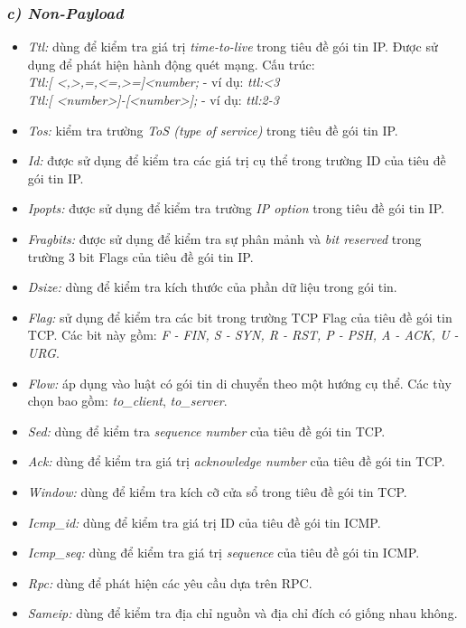 \subsubsection*{\textit{c) Non-Payload}}

\begin{itemize}
\item \emph{Ttl:} dùng để kiểm tra giá trị \emph{time-to-live} trong tiêu đề gói tin IP. Được sử dụng để phát hiện hành động quét mạng. Cấu trúc:
\\ \tab \emph{Ttl:[ <,>,=,<=,>=]<number;} - ví dụ: \emph{ttl:<3}
\\ \tab \emph{Ttl:[ <number>]-[<number>];} - ví dụ: \emph{ttl:2-3}
\item \emph{Tos:} kiểm tra trường \emph{ToS (type of service)} trong tiêu đề gói tin IP.
\item \emph{Id:} được sử dụng để kiểm tra các giá trị cụ thể trong trường ID của tiêu đề gói tin IP.
\item \emph{Ipopts:} được sử dụng để kiểm tra trường \emph{IP option} trong tiêu đề gói tin IP.
\item \emph{Fragbits:} được sử dụng để kiểm tra sự phân mảnh và \emph{bit reserved} trong trường 3 bit Flags của tiêu đề gói tin IP.
\item \emph{Dsize:} dùng để kiểm tra kích thước của phần dữ liệu trong gói tin.
\item \emph{Flag:} sử dụng để kiểm tra các bit trong trường TCP Flag của tiêu đề gói tin TCP. Các bit này gồm: \emph{F - FIN, S - SYN, R - RST, P - PSH, A - ACK, U - URG}.
\item \emph{Flow:} áp dụng vào luật có gói tin di chuyển theo một hướng cụ thể. Các tùy chọn bao gồm: \emph{to\_client}, \emph{to\_server}.
\item \emph{Sed:} dùng để kiểm tra \emph{sequence number} của tiêu đề gói tin TCP.
\item \emph{Ack:} dùng để kiểm tra giá trị \emph{acknowledge number} của tiêu đề gói tin TCP.
\item \emph{Window:} dùng để kiểm tra kích cỡ cửa sổ trong tiêu đề gói tin TCP.
\item \emph{Icmp\_id:} dùng để kiểm tra giá trị ID của tiêu đề gói tin ICMP.
\item \emph{Icmp\_seq:} dùng để kiểm tra giá trị \emph{sequence} của tiêu đề gói tin ICMP.
\item \emph{Rpc:} dùng để phát hiện các yêu cầu dựa trên RPC.
\item \emph{Sameip:} dùng để kiểm tra địa chỉ nguồn và địa chỉ đích có giống nhau không.
\end{itemize}

